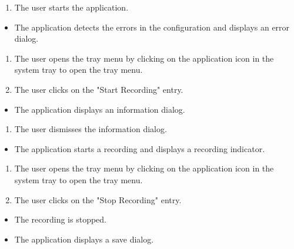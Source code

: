 \begin{tests}
    {\begin{enumerate}
        \item The \gls{user} starts the application.
    \end{enumerate}}
    {\begin{itemize}
        \item The application detects the errors in the configuration and displays an error dialog.
    \end{itemize}}

    {\begin{enumerate}
        \item The \gls{user} opens the tray menu by clicking on the application icon in the system tray to open the tray menu.
        \item The \gls{user} clicks on the "Start Recording" entry.
    \end{enumerate}}
    {\begin{itemize}
        \item The application displays an information dialog.
    \end{itemize}}
    
    {\begin{enumerate}
        \item The \gls{user} dismisses the information dialog.
    \end{enumerate}}
    {\begin{itemize}
        \item The application starts a recording and displays a recording indicator.
    \end{itemize}}
    
    {\begin{enumerate}
        \item The \gls{user} opens the tray menu by clicking on the application icon in the system tray to open the tray menu.
        \item The \gls{user} clicks on the "Stop Recording" entry.
    \end{enumerate}}
    {\begin{itemize}
        \item The recording is stopped.
        \item The application displays a save dialog.
    \end{itemize}}


\end{tests}
